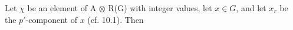 Let $\chi$ be an element of A $\otimes$ R(G) with integer values, let $x \in G$, and let $x_r$ be the $p'$-component of $x$ (cf. 10.1). Then
